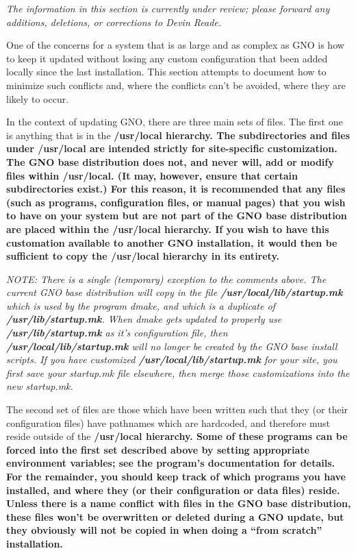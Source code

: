 \documentclass{report}
\begin{document}
\it The information in this section is currently under review; please
forward any additions, deletions, or corrections to Devin Reade.\rm

One of the concerns for a system that is as large and as complex as GNO
is how to keep it updated without losing any custom configuration that
been added locally since the last installation.  This section attempts to
document how to minimize such conflicts and, where the conflicts can't
be avoided, where they are likely to occur.

In the context of updating GNO, there are three main sets of files.  The
first one is anything that is in the \bf /usr/local \rm hierarchy.  The
subdirectories and files under \bf /usr/local \rm are intended strictly
for site-specific customization.  The GNO base distribution does not,
and never will, add or modify files within \bf /usr/local\rm.  (It may,
however, ensure that certain subdirectories exist.)  For this reason,
it is recommended that any files (such as programs, configuration files,
or manual pages) that you wish to have on your system but are not part
of the GNO base distribution are placed within the \bf /usr/local \rm
hierarchy.  If you wish to have this customation available to another
GNO installation, it would then be sufficient to copy the \bf /usr/local \rm
hierarchy in its entirety.

\em
NOTE:  There is a single (temporary) exception to the comments above.  The
current GNO base distribution will copy in the file 
\textbf{/usr/local/lib/startup.mk}
which is used by the program dmake, and which is a duplicate of 
\textbf{/usr/lib/startup.mk}.
When dmake gets updated to properly use 
\textbf{/usr/lib/startup.mk}
as it's configuration file, then 
\textbf{/usr/local/lib/startup.mk}
will no longer be created by the GNO base install scripts.  If you have 
customized 
\textbf{/usr/local/lib/startup.mk}
for your site, you first save your startup.mk file elsewhere, then merge
those customizations into the new startup.mk.
\rm

The second set of files are those which have been written such that they
(or their configuration files) have pathnames which are hardcoded, and 
therefore must reside outside of the \bf /usr/local \rm hierarchy.  Some
of these programs can be forced into the first set described above by
setting appropriate environment variables; see the program's documentation
for details.  For the remainder, you should keep track of which programs
you have installed, and where they (or their configuration or data files) 
reside.  Unless there is a name conflict with files in the GNO base 
distribution, these files won't be overwritten or deleted during a GNO
update, but they obviously will not be copied in when doing a ``from scratch''
installation.
\end{document}
